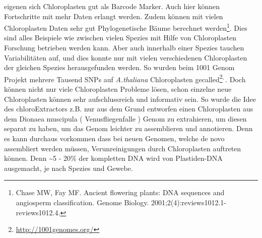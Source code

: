 \documentclass{scrartcl}
\begin{document}
eigenen sich Chloroplasten gut als Barcode Marker. Auch hier können Fortschritte mit mehr Daten erlangt werden. Zudem können mit vielen Chloroplasten Daten sehr gut Phylogenetische Bäume berechnet werden\footnote{Chase MW, Fay MF. Ancient flowering plants: DNA sequences and angiosperm classification. Genome Biology. 2001;2(4):reviews1012.1-reviews1012.4.}.
Dies sind alles Beispiele wie zwischen vielen Spezies mit Hilfe von Chloroplasten Forschung betrieben werden kann. Aber auch innerhalb einer Spezies tauchen Variabilitäten auf, und dies konnte nur mit vielen verschiedenen
Chloroplasten der gleichen Spezies herausgefunden werden. So wurden beim 1001 Genom Projekt mehrere Tausend SNPs auf \emph{A.thaliana} Chloroplasten gecalled\footnote{\url{http://1001genomes.org/}}\textsuperscript{,}\,\footnotemark[7]{}. 
Doch können nicht nur viele Chloroplasten Probleme lösen, schon einzelne neue Chloroplasten können sehr aufschlussreich und informativ sein. So wurde die Idee des chloroExtractors z.B. nur aus dem Grund
entworfen einen Chloroplasten aus dem Dionaea muscipula ( Venusfliegenfalle ) Genom zu extrahieren, um diesen separat zu haben, um das Genom leichter zu assemblieren und annotieren. Denn es kann durchaus vorkommen
dass bei neuen Genomen, welche de novo assembliert werden müssen, Verunreinigungen durch Chloroplasten auftreten können. Denn \textasciitilde{}5 - 20\% der kompletten DNA wird von Plastiden-DNA ausgemacht, je nach Spezies und Gewebe\footnotemark[33]{}.
\end{document}
